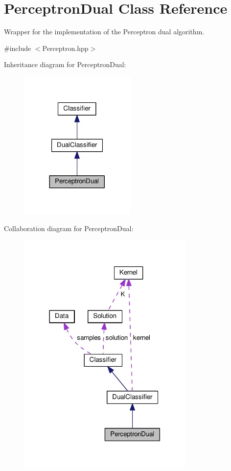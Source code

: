 \hypertarget{class_perceptron_dual}{}\section{Perceptron\+Dual Class Reference}
\label{class_perceptron_dual}


Wrapper for the implementation of the Perceptron dual algorithm.  




{\ttfamily \#include $<$Perceptron.\+hpp$>$}



Inheritance diagram for Perceptron\+Dual\+:\nopagebreak
\begin{figure}[H]
\begin{center}
\leavevmode
\includegraphics[width=164pt]{class_perceptron_dual__inherit__graph}
\end{center}
\end{figure}


Collaboration diagram for Perceptron\+Dual\+:\nopagebreak
\begin{figure}[H]
\begin{center}
\leavevmode
\includegraphics[width=249pt]{class_perceptron_dual__coll__graph}
\end{center}
\end{figure}
